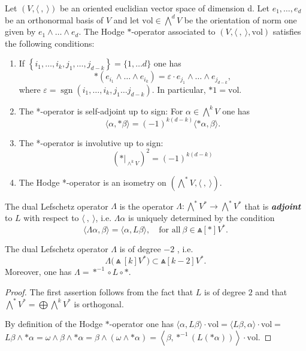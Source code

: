\begin{proposition}
  Let $(V,\langle~,~\rangle)$ be an oriented euclidian vector space of dimension d. Let $e_1, \ldots, e_d$ be an orthonormal basis of $V$ and let $\mathrm{vol} \in \bigwedge^d V$ be the orientation of norm one given by $e_1 \wedge \ldots \wedge e_d$. The Hodge $*$-operator associated to $(V,\langle~,~\rangle, \mathrm{vol})$ satisfies the following conditions:
\begin{enumerate}[label=\roman*),font=\upshape]
  \item If $\left\{i_1, \ldots, i_k, j_1, \ldots, j_{d-k}\right\}=\{1, \ldots d\}$ one has
$$
*\left(e_{i_1} \wedge \ldots \wedge e_{i_k}\right)=\varepsilon \cdot e_{j_1} \wedge \ldots \wedge e_{j_{d-k}},
$$
where $\varepsilon=\operatorname{sgn}\left(i_1, \ldots, i_k, j_1 \ldots j_{d-k}\right)$. In particular, $* 1= \mathrm{vol}$.
  \item The *-operator is self-adjoint up to sign: For $\alpha \in \bigwedge^k V$ one has
$$
\langle\alpha, * \beta\rangle=(-1)^{k(d-k)}\langle * \alpha, \beta\rangle .
$$
  \item The *-operator is involutive up to sign:
$$
\left(* \big|_{\wedge^k V}\right)^2=(-1)^{k(d-k)}
$$
  \item The Hodge *-operator is an isometry on $\left(\bigwedge^* V,\langle~,~\rangle\right)$.
\end{enumerate}
\end{proposition}
\begin{definition}
  The \textsf{dual Lefschetz operator} $\Lambda$ is the operator $\Lambda\colon \bigwedge^* V^*\to\bigwedge^* V^*$ that is \textbf{\textit{adjoint}} to $L$ with respect to $\langle~,~\rangle$, i.e. $\Lambda\alpha$ is uniquely determined by the condition 
  \[
    \langle \Lambda\alpha,\beta\rangle=\langle\alpha,L\beta\rangle, \quad \text{for all} ~\beta\in \Wedge[*]V^*.
  \]
\end{definition}
\clearpage
\begin{proposition}
  The dual Lefschetz operator $\Lambda$ is of degree $-2$ , i.e. 
  $$\Lambda\bigl(\Wedge[k] V^*\bigr) \subset\Wedge[k-2] V^*.$$ 
  Moreover, one has $\Lambda=*^{-1} \circ L \circ *$.
\end{proposition}
\begin{proof}
The first assertion follows from the fact that $L$ is of degree $2$ and that $\bigwedge^* V^*=\bigoplus \bigwedge^k V^*$ is orthogonal.

By definition of the Hodge $*$-operator one has $\langle\alpha, L \beta\rangle \cdot \mathrm{vol}=\langle L \beta, \alpha\rangle \cdot \mathrm{vol}=$ $L \beta \wedge * \alpha=\omega \wedge \beta \wedge * \alpha=\beta \wedge(\omega \wedge * \alpha)=\left\langle\beta, *^{-1}(L(* \alpha))\right\rangle \cdot\mathrm{vol}$.
\end{proof}

